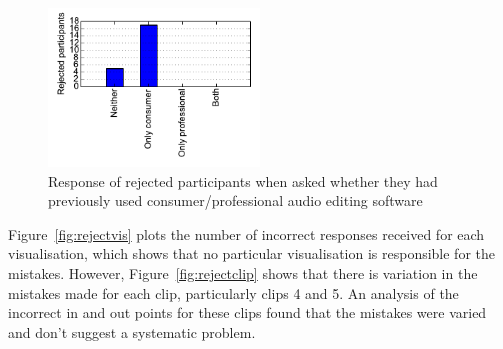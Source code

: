 \begin{figure}[ht]
  \centering
  \includegraphics[width=0.5\textwidth]{figs/reject-daw.pdf}
  \caption{Response of rejected participants when asked whether they had previously used consumer/professional audio
    editing software}
  \label{fig:rejectdaw}
\end{figure}

Figure~\ref{fig:rejectvis} plots the number of incorrect responses received for each visualisation, which shows that no
particular visualisation is responsible for the mistakes. However, Figure~\ref{fig:rejectclip} shows that there is
variation in the mistakes made for each clip, particularly clips 4 and 5. An analysis of the incorrect in and out
points for these clips found that the mistakes were varied and don't suggest a systematic problem. 

